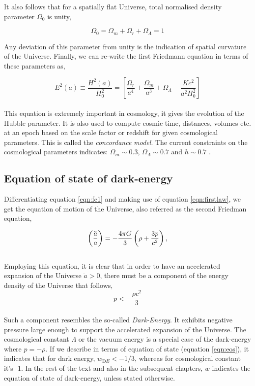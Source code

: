 It also follows that for a spatially flat Universe, total normalised 
density parameter $\Omega_0$ is unity,

\begin{equation}
	\Omega_0 = \Omega_m + \Omega_r + \Omega_{\Lambda} = 1
\end{equation}

Any deviation of this 
parameter from unity is the indication of spatial curvature of the Universe.
Finally, we can re-write the first Friedmann equation in terms of these parameters as,

\begin{equation}
	E^2(a) \equiv \dfrac{H^2(a)}{H_0^2} = \left[\dfrac{\Omega_r}{a^4}
	 + \dfrac{\Omega_m}{a^3} +
	 \Omega_{\Lambda} - \dfrac{Kc^2}{a^2H_0^2}  \right]
	 \label{eqn:hubbleparameter}
\end{equation}
\\
This equation is extremely important in cosmology, it gives the evolution of the 
Hubble parameter. It is also used to compute cosmic time, distances, volumes
etc. at an epoch based on the scale factor or redshift for given cosmological
parameters. This is called the {\em concordance model}. The current constraints on the
cosmological parameters indicates: $\Omega_m \sim 0.3$, $\Omega_{\Lambda} \sim 0.7$
and $h \sim 0.7$ \citep{2015arXiv150201589P}.


\subsection{Equation of state of dark-energy}

Differentiating equation \ref{eqn:fe1} and making use of equation
\ref{eqn:firstlaw}, we get the equation of motion of the Universe,
also referred as the second Friedman equation,

\begin{equation}
\centering
		\left( \dfrac{\ddot{a}}{a} \right) = -\dfrac{4 \pi G}{3} 
			\left( \rho + \dfrac{3p}{c^2} \right),
\label{eqn:fe2}
\end{equation}
\\
Employing this equation, it is clear that in order to have an 
accelerated expansion of the Universe $\ddot{a}>0$,
there must be a component of the energy density of the Universe that follows,
\begin{equation}
	p < -\dfrac{\rho c^2}{3} 
\end{equation}
\\
Such a component resembles the so-called {\it Dark-Energy}. It exhibits 
negative pressure large enough to support the accelerated expansion of the
Universe. The cosmological constant $\Lambda$  or the vacuum energy is a 
special case of the dark-energy where $p=-\rho$. If we describe in terms 
of equation of state (equation \ref{eqn:eos}), it indicates that for 
dark energy, $w_{\mathrm DE}<-1/3$, whereas for cosmological constant it's -1.
In the rest of the text and also in the subsequent chapters, $w$ indicates
the equation of state of dark-energy, unless stated otherwise.

